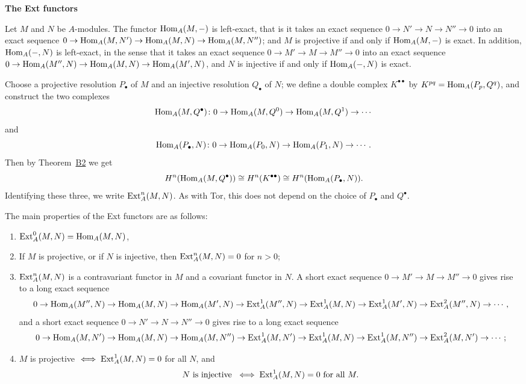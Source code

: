 \medskip
\noindent\textbf{The Ext functors}

Let $M$ and $N$ be $A$-modules. The functor $\operatorname{Hom}_A(M, -)$ is left-exact, that is it
takes an exact sequence $0 \to N' \to N \to N'' \to 0$ into an exact sequence
$0 \to \operatorname{Hom}_A(M, N') \to \operatorname{Hom}_A(M, N) \to \operatorname{Hom}_A(M, N'')$; and $M$ is projective if and
only if $\operatorname{Hom}_A(M, -)$ is exact. In addition, $\operatorname{Hom}_A(-, N)$ is left-exact, in the sense
that it takes an exact sequence $0 \to M' \to M \to M'' \to 0$ into an exact sequence
$0 \to \operatorname{Hom}_A(M'', N) \to \operatorname{Hom}_A(M, N) \to \operatorname{Hom}_A(M', N)$, and $N$ is injective if and
only if $\operatorname{Hom}_A(-, N)$ is exact.

Choose a projective resolution $P_\bullet$ of $M$ and an injective resolution $Q_\bullet$ of $N$;
we define a double complex $K^{\bullet\bullet}$ by $K^{pq} = \operatorname{Hom}_A(P_p, Q^q)$, and construct
the two complexes
\[
  \operatorname{Hom}_A(M, Q^\bullet)\colon 0 \to \operatorname{Hom}_A(M, Q^0) \to \operatorname{Hom}_A(M, Q^1) \to \cdots
\]
and
\[
  \operatorname{Hom}_A(P_\bullet, N)\colon 0 \to \operatorname{Hom}_A(P_0, N) \to \operatorname{Hom}_A(P_1, N) \to \cdots.
\]
Then by Theorem~\hyperref[thm:B2]{B2} we get
\[
  H^n(\operatorname{Hom}_A(M, Q^\bullet)) \cong H^n(K^{\bullet\bullet}) \cong H^n(\operatorname{Hom}_A(P_\bullet, N)).
\]
Identifying these three, we write $\operatorname{Ext}^n_A(M, N)$. As with Tor, this does not depend
on the choice of $P_\bullet$ and $Q^\bullet$.

The main properties of the Ext functors are as follows:
\begin{enumerate}[(1)]
  \item $\operatorname{Ext}^0_A(M, N) = \operatorname{Hom}_A(M, N)$,
  \item If $M$ is projective, or if $N$ is injective, then $\operatorname{Ext}^n_A(M, N) = 0$ for $n > 0$;
  \item $\operatorname{Ext}^n_A(M, N)$ is a contravariant functor in $M$ and a covariant functor
        in $N$. A short exact sequence $0 \to M' \to M \to M'' \to 0$ gives rise to
        a long exact sequence
        \[
          0 \to \operatorname{Hom}_A(M'', N) \to \operatorname{Hom}_A(M, N) \to \operatorname{Hom}_A(M', N)
          \to \operatorname{Ext}^1_A(M'', N) \to \operatorname{Ext}^1_A(M, N) \to \operatorname{Ext}^1_A(M', N)
          \to \operatorname{Ext}^2_A(M'', N) \to \cdots,
        \]
        and a short exact sequence $0 \to N' \to N \to N'' \to 0$ gives rise to a long
        exact sequence
        \[
          0 \to \operatorname{Hom}_A(M, N') \to \operatorname{Hom}_A(M, N) \to \operatorname{Hom}_A(M, N'')
          \to \operatorname{Ext}^1_A(M, N') \to \operatorname{Ext}^1_A(M, N) \to \operatorname{Ext}^1_A(M, N'')
          \to \operatorname{Ext}^2_A(M, N') \to \cdots;
        \]
  \item $M$ is projective $\iff \operatorname{Ext}^1_A(M, N) = 0$ for all $N$,
        and
        \[
          N \text{ is injective } \iff \operatorname{Ext}^1_A(M, N) = 0 \text{ for all } M.
        \]
\end{enumerate}

